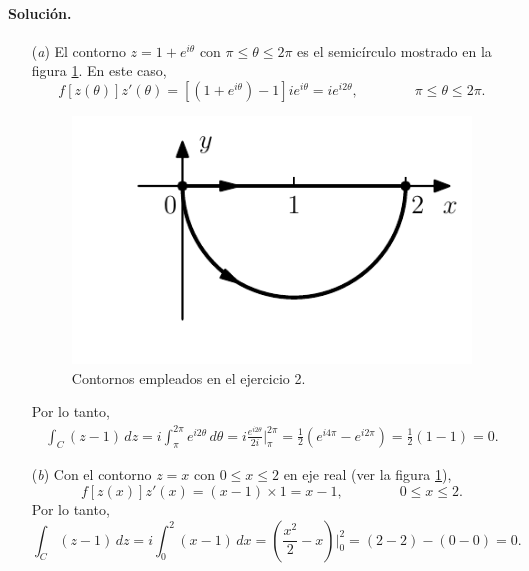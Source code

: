 \documentclass[a4paper]{report}
\begin{document}
\paragraph{Solución.} 
\begin{itemize}
 \item[(\textit{a})] El contorno \(z=1+e^{i\theta}\) con \(\pi\leq\theta\leq2\pi\) es el semicírculo mostrado en la figura \ref{fig:exercise_46_02}.
En este caso, 
\[
 f[z(\theta)]z'(\theta)=\left[(1+e^{i\theta})-1\right]ie^{i\theta}=ie^{i2\theta},
 \qquad\qquad
 \pi\leq\theta\leq2\pi.
\]
 \begin{figure}[!htb]
  \begin{minipage}[c]{0.35\textwidth}
    \includegraphics[width=\textwidth]{figuras/exercise_46_02.pdf}
  \end{minipage}\hfill
  \begin{minipage}[c]{0.55\textwidth}
    \caption{
        Contornos empleados en el ejercicio 2.
    }\label{fig:exercise_46_02}
  \end{minipage}
\end{figure}
Por lo tanto,
\begin{align*}
 \int_C(z-1)\,dz=i\int_\pi^{2\pi}e^{i2\theta}\,d\theta=i\frac{e^{i2\theta}}{2i}\bigg|_\pi^{2\pi}=\frac{1}{2}(e^{i4\pi}-e^{i2\pi})=\frac{1}{2}(1-1)=0.
\end{align*}
 \item[(\textit{b})] Con el contorno \(z=x\) con \(0\leq x\leq2\) en eje real (ver la figura \ref{fig:exercise_46_02}),
 \[
  f[z(x)]z'(x)=(x-1)\times1=x-1,
  \qquad\qquad
 0\leq x\leq2.
 \]
 Por lo tanto,
 \[
  \int_C(z-1)\,dz=i\int_0^2(x-1)\,dx=\left(\frac{x^2}{2}-x\right)\bigg|_0^2=(2-2)-(0-0)=0.
 \]
\end{itemize}
\end{document}
